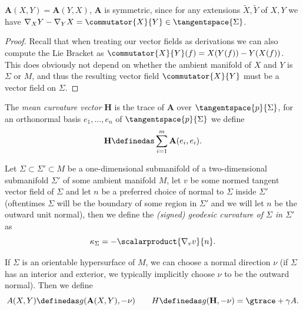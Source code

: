 \documentclass[titlepage,numbers=noenddot,oneside,%
cleardoublepage=empty,paper=a4,fontsize=11pt,%
english,%
]{scrartcl}
\begin{document}
{\begin{fact}
    \( \mathbf{A}(X,Y)=\mathbf{A}(Y,X) \), \ie \( \mathbf{A} \) is symmetric, since for any extensions \( \tilde{X},\tilde{Y} \) of \( X,Y \) we have \( \Mconnection_X Y-\Mconnection_Y X=\commutator{X}{Y}\in \tangentspace{\Sigma} \).
\end{fact}
\begin{proof}
    Recall that when treating our vector fields as derivations we can also compute the Lie Bracket  as \( \commutator{X}{Y}(f)=X(Y(f))-Y(X(f)) \). This does obviously not depend on whether the ambient manifold of \( X \) and \( Y \) is \( \Sigma \) or \( M \), and thus the resulting vector field \( \commutator{X}{Y} \) must be a vector field on \( \Sigma \). 
\end{proof}
\begin{definition}
    The \emph{mean curvature vector} \( \mathbf{H} \) is the trace of \( \mathbf{A} \) over \( \tangentspace{p}{\Sigma} \), \ie for an orthonormal basis \( e_1,\dotsc,e_n \) of \( \tangentspace{p}{\Sigma} \) we define
    \begin{equation*}
        \mathbf{H}\definedas \sum_{i=1}^{m}\mathbf{A}(e_i,e_i).
    \end{equation*}
\end{definition}
\begin{definition}\label{def:geodesic_curvature}
    Let \( \Sigma\subset \Sigma'\subset M \) be a one-dimensional submanifold of a two-dimensional submanifold \( \Sigma' \) of some ambient manifold \( M \), let \( v \) be some normed tangent vector field of \( \Sigma \) and let \( n \) be a preferred choice of normal to \( \Sigma \) inside \( \Sigma' \) (oftentimes \( \Sigma \) will be the boundary of some region in \( \Sigma' \) and we will let \( n \) be the outward unit normal), then we define the \emph{(signed) geodesic curvature of \( \Sigma \) in \( \Sigma' \)} as
    \begin{equation}\label{eq:def_geodesic_curvature}
        \kappa_{\Sigma}=-\scalarproduct{\nabla_v v}{n}.
    \end{equation}
\end{definition}
\begin{definition}
    If \( \Sigma \) is an orientable hypersurface of \( M \), we can choose a normal direction \( \nu \) (if \( \Sigma \) has an interior and exterior, we typically implicitly choose \( \nu \) to be the outward normal). Then we define
    \begin{equation}
        A(X,Y)\definedas g(\mathbf{A}(X,Y),-\nu)\qquad H\definedas g(\mathbf{H},-\nu)=\gtrace+{\gamma}{A}.\label{eq:def_mean_curvature}

\end{equation}
\end{definition}}
\end{document}
